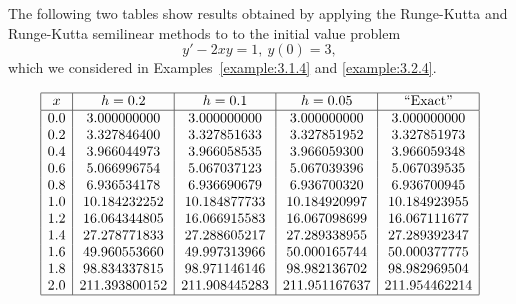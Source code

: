 \documentclass{ximera}
\begin{document}
\begin{example}\label{example:3.3.4}
The following two tables show results obtained by
applying the Runge-Kutta and Runge-Kutta semilinear methods to
to the initial value problem
$$
y'-2xy=1,\ y(0)=3,
$$
which we considered in Examples~\ref{example:3.1.4}  and
\ref{example:3.2.4}.


$$
\begin{array}{|c|c|c|c|c|}
\hline
x&
h=0.2&
h=0.1&
h=0.05&
\text{``Exact''}\\ \hline
0.0 &   3.000000000 &   3.000000000 &   3.000000000 &   3.000000000 \\
0.2 &   3.327846400 &   3.327851633 &   3.327851952 &   3.327851973 \\
0.4 &   3.966044973 &   3.966058535 &   3.966059300 &   3.966059348 \\
0.6 &   5.066996754 &   5.067037123 &   5.067039396 &   5.067039535 \\
0.8 &   6.936534178 &   6.936690679 &   6.936700320 &   6.936700945 \\
1.0 &  10.184232252 &  10.184877733 &  10.184920997 &  10.184923955 \\
1.2 &  16.064344805 &  16.066915583 &  16.067098699 &  16.067111677 \\
1.4 &  27.278771833 &  27.288605217 &  27.289338955 &  27.289392347 \\
1.6 &  49.960553660 &  49.997313966 &  50.000165744 &  50.000377775 \\
1.8 &  98.834337815 &  98.971146146 &  98.982136702 &  98.982969504 \\
2.0 & 211.393800152 & 211.908445283 & 211.951167637 & 211.954462214 \\
\hline
\end{array}
$$


\end{example}
\end{document}
